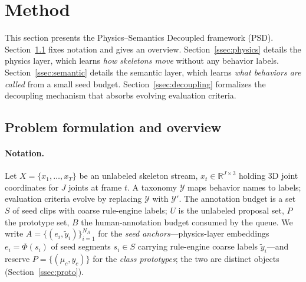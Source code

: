 \section{Method}\label{sec:method}

This section presents the Physics--Semantics Decoupled framework (PSD). Section~\ref{ssec:formulation} fixes notation and gives an overview. Section~\ref{ssec:physics} details the physics layer, which learns \emph{how skeletons move} without any behavior labels. Section~\ref{ssec:semantic} details the semantic layer, which learns \emph{what behaviors are called} from a small seed budget. Section~\ref{ssec:decoupling} formalizes the decoupling mechanism that absorbs evolving evaluation criteria.

\subsection{Problem formulation and overview}\label{ssec:formulation}

\paragraph{Notation.}
Let $X = \{x_1, \dots, x_T\}$ be an unlabeled skeleton stream, $x_t \in \mathbb{R}^{J \times 3}$ holding 3D joint coordinates for $J$ joints at frame $t$. A taxonomy $\mathcal{Y}$ maps behavior names to labels; evaluation criteria evolve by replacing $\mathcal{Y}$ with $\mathcal{Y}'$. The annotation budget is a set $S$ of seed clips with coarse rule-engine labels; $U$ is the unlabeled proposal set, $P$ the prototype set, $B$ the human-annotation budget consumed by the queue. We write $A = \{(e_i, \tilde{y}_i)\}_{i=1}^{N_A}$ for the \emph{seed anchors}---physics-layer embeddings $e_i = \Phi(s_i)$ of seed segments $s_i \in S$ carrying rule-engine coarse labels $\tilde{y}_i$---and reserve $P = \{(\mu_c, y_c)\}$ for the \emph{class prototypes}; the two are distinct objects (Section~\ref{ssec:proto}).

